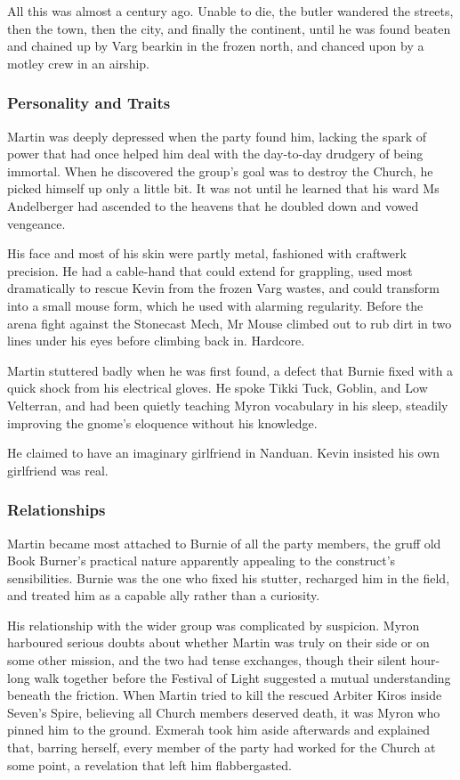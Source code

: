 All this was almost a century ago.  Unable to die, the butler wandered the streets, then the town, then the city, and finally the continent, until he was found beaten and chained up by Varg bearkin in the frozen north, and chanced upon by a motley crew in an airship.

\subsubsection{Personality and Traits}

Martin was deeply depressed when the party found him, lacking the spark of power that had once helped him deal with the day-to-day drudgery of being immortal.  When he discovered the group's goal was to destroy the Church, he picked himself up only a little bit.  It was not until he learned that his ward Ms Andelberger had ascended to the heavens that he doubled down and vowed vengeance.

His face and most of his skin were partly metal, fashioned with craftwerk precision.  He had a cable-hand that could extend for grappling, used most dramatically to rescue Kevin from the frozen Varg wastes, and could transform into a small mouse form, which he used with alarming regularity.  Before the arena fight against the Stonecast Mech, Mr Mouse climbed out to rub dirt in two lines under his eyes before climbing back in.  Hardcore.

Martin stuttered badly when he was first found, a defect that Burnie fixed with a quick shock from his electrical gloves.  He spoke Tikki Tuck, Goblin, and Low Velterran, and had been quietly teaching Myron vocabulary in his sleep, steadily improving the gnome's eloquence without his knowledge.

He claimed to have an imaginary girlfriend in Nanduan.  Kevin insisted his own girlfriend was real.

\subsubsection{Relationships}

Martin became most attached to Burnie of all the party members, the gruff old Book Burner's practical nature apparently appealing to the construct's sensibilities.  Burnie was the one who fixed his stutter, recharged him in the field, and treated him as a capable ally rather than a curiosity.

His relationship with the wider group was complicated by suspicion.  Myron harboured serious doubts about whether Martin was truly on their side or on some other mission, and the two had tense exchanges, though their silent hour-long walk together before the Festival of Light suggested a mutual understanding beneath the friction.  When Martin tried to kill the rescued Arbiter Kiros inside Seven's Spire, believing all Church members deserved death, it was Myron who pinned him to the ground.  Exmerah took him aside afterwards and explained that, barring herself, every member of the party had worked for the Church at some point, a revelation that left him flabbergasted.


